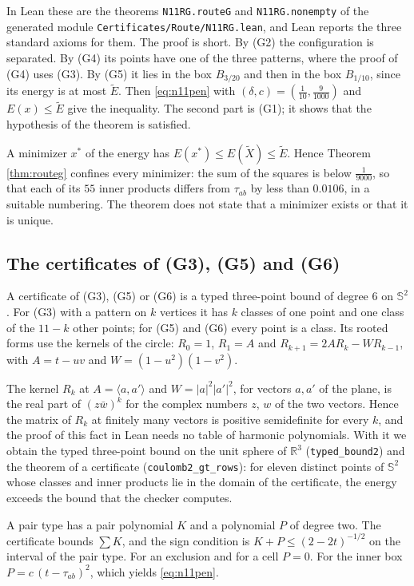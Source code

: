 \documentclass[reqno,a4paper,11pt]{amsart}
\numberwithin{equation}{section}
\def\R{{\mathbb R}}
\newcommand{\Sph}{\mathbb{S}}
\newcommand{\lean}[1]{\texttt{#1}}
\newcommand{\file}[1]{\nolinkurl{#1}}
\begin{document}
In Lean these are the theorems \lean{N11RG.routeG} and \lean{N11RG.nonempty} of the generated module \file{Certificates/Route/N11RG.lean}, and Lean reports the three standard axioms for them. The proof is short. By (G2) the configuration is separated. By (G4) its points have one of the three patterns, where the proof of (G4) uses (G3). By (G5) it lies in the box $B_{3/20}$ and then in the box $B_{1/10}$, since its energy is at most $\tilde E$. Then \eqref{eq:n11pen} with $(\delta, c) = (\tfrac{1}{10}, \tfrac{9}{1000})$ and $E(x) \leq \tilde E$ give the inequality. The second part is (G1); it shows that the hypothesis of the theorem is satisfied.

A minimizer $x^*$ of the energy has $E(x^*) \leq E(\tilde X) \leq \tilde E$. Hence Theorem \ref{thm:routeg} confines every minimizer: the sum of the squares is below $\tfrac{1}{9000}$, so that each of its $55$ inner products differs from $\tau_{ab}$ by less than $0.0106$, in a suitable numbering. The theorem does not state that a minimizer exists or that it is unique.

\subsection{The certificates of (G3), (G5) and (G6)}\label{sec:n11gnormal}

A certificate of (G3), (G5) or (G6) is a typed three-point bound of degree $6$ on $\Sph^2$. For (G3) with a pattern on $k$ vertices it has $k$ classes of one point and one class of the $11-k$ other points; for (G5) and (G6) every point is a class. Its rooted forms use the kernels of the circle: $R_0 = 1$, $R_1 = A$ and $R_{k+1} = 2 A R_k - W R_{k-1}$, with $A = t - uv$ and $W = (1-u^2)(1-v^2)$.

The kernel $R_k$ at $A = \langle a, a' \rangle$ and $W = |a|^2 |a'|^2$, for vectors $a, a'$ of the plane, is the real part of $(z \bar w)^k$ for the complex numbers $z$, $w$ of the two vectors. Hence the matrix of $R_k$ at finitely many vectors is positive semidefinite for every $k$, and the proof of this fact in Lean needs no table of harmonic polynomials. With it we obtain the typed three-point bound on the unit sphere of $\R^3$ (\lean{typed\_bound2}) and the theorem of a certificate (\lean{coulomb2\_gt\_rows}): for eleven distinct points of $\Sph^2$ whose classes and inner products lie in the domain of the certificate, the energy exceeds the bound that the checker computes.

A pair type has a pair polynomial $K$ and a polynomial $P$ of degree two. The certificate bounds $\sum K$, and the sign condition is $K + P \leq (2-2t)^{-1/2}$ on the interval of the pair type. For an exclusion and for a cell $P = 0$. For the inner box $P = c\,(t - \tau_{ab})^2$, which yields \eqref{eq:n11pen}.
\end{document}
